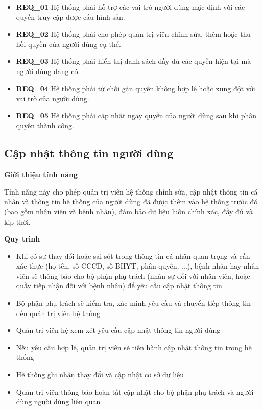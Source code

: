 \begin{itemize} 
    \item \textbf{REQ\_01} Hệ thống phải hỗ trợ các vai trò người dùng mặc định với các quyền truy cập được cấu hình sẵn.

    \item \textbf{REQ\_02} Hệ thống phải cho phép quản trị viên chỉnh sửa, thêm hoặc thu hồi quyền của người dùng cụ thể.

    \item \textbf{REQ\_03} Hệ thống phải hiển thị danh sách đầy đủ các quyền hiện tại mà người dùng đang có.

    \item \textbf{REQ\_04} Hệ thống phải từ chối gán quyền không hợp lệ hoặc xung đột với vai trò của người dùng.

    \item \textbf{REQ\_05} Hệ thống phải cập nhật ngay quyền của người dùng sau khi phân quyền thành công.
\end{itemize}

\subsection{Cập nhật thông tin người dùng}

\noindent \textbf{Giới thiệu tính năng}

Tính năng này cho phép quản trị viên hệ thống chỉnh sửa, cập nhật thông tin cá nhân và thông tin hệ thống của người dùng đã được thêm vào hệ thống trước đó (bao gồm nhân viên và bệnh nhân), đảm bảo dữ liệu luôn chính xác, đầy đủ và kịp thời.

\noindent \textbf{Quy trình}

\begin{itemize} 
    \item Khi có sự thay đổi hoặc sai sót trong thông tin cá nhân quan trọng và cần xác thực (họ tên, số CCCD, số BHYT, phân quyền, ...), bệnh nhân hay nhân viên sẽ thông báo cho bộ phận phụ trách (nhân sự đối với nhân viên, hoặc quầy tiếp nhận đối với bệnh nhân) để yêu cầu cập nhật thông tin  
    \item Bộ phận phụ trách sẽ kiểm tra, xác minh yêu cầu và chuyển tiếp thông tin đến quản trị viên hệ thống 
    \item Quản trị viên hệ xem xét yêu cầu cập nhật thông tin người dùng 
    \item Nếu yêu cầu hợp lệ, quản trị viên sẽ tiến hành cập nhật thông tin trong hệ thống
    \item Hệ thống ghi nhận thay đổi và cập nhật cơ sở dữ liệu 
    \item Quản trị viên thông báo hoàn tất cập nhật cho bộ phận phụ trách và người dùng người dùng liên quan
\end{itemize}

